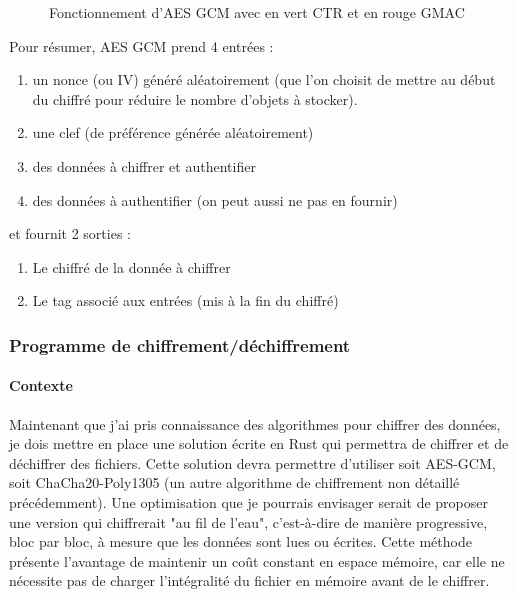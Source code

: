 \documentclass[a4paper, 12pt]{article}
\begin{document}
\begin{figure}[h]
\caption{Fonctionnement d'AES GCM avec en vert CTR et en rouge GMAC}
\label{aesgcm}
\end{figure}


\noindent Pour résumer, AES GCM prend 4 entrées : 
\begin{enumerate}
	\item un nonce (ou IV) généré aléatoirement (que l'on choisit de mettre au début du chiffré pour réduire le nombre d'objets à stocker).
	\item une clef (de préférence générée aléatoirement)
	\item des données à chiffrer et authentifier 
	\item des données à authentifier (on peut aussi ne pas en fournir)
\end{enumerate}
\noindent et fournit 2 sorties :
\begin{enumerate}
	\item Le chiffré de la donnée à chiffrer
\item Le tag associé aux entrées (mis à la fin du chiffré)
\end{enumerate}

\subsubsection{Programme de chiffrement/déchiffrement}
\paragraph{Contexte}
Maintenant que j'ai pris connaissance des algorithmes pour chiffrer des données, je dois mettre en place une solution écrite en Rust qui permettra de chiffrer et de déchiffrer des fichiers. Cette solution devra permettre d'utiliser soit AES-GCM, soit ChaCha20-Poly1305 (un autre algorithme de chiffrement non détaillé précédemment).
Une optimisation que je pourrais envisager serait de proposer une version qui chiffrerait "au fil de l'eau", c'est-à-dire de manière progressive, bloc par bloc, à mesure que les données sont lues ou écrites. Cette méthode présente l'avantage de maintenir un coût constant en espace mémoire, car elle ne nécessite pas de charger l'intégralité du fichier en mémoire avant de le chiffrer. \\
\end{document}
